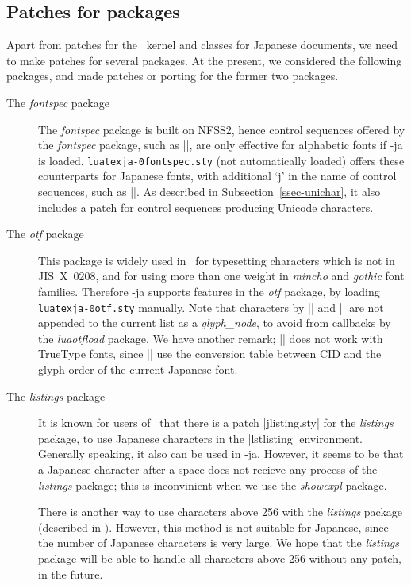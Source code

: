 \documentclass{ajt}
\begin{document}
\subsection{Patches for packages}
Apart from patches for the \LaTeXe~kernel and classes for Japanese
documents, we need to make patches for several packages. At the present,
we considered the following packages, and made patches or porting for
the former two packages.

\begin{description}
\item[The \emph{fontspec} package] The \emph{fontspec} package is built
	   on NFSS2, hence control sequences offered by the
	   \emph{fontspec} package, such as |\setmainfont|, are only
	   effective for alphabetic fonts if \LuaTeX-ja is loaded.
	   \texttt{luatexja-\penalty0fontspec.sty} (not automatically
	   loaded) offers these counterparts for Japanese fonts, with
	   additional `j' in the name of control sequences, such as
	   |\setmainjfont|. As described in
	   Subsection~\ref{ssec-unichar}, it also includes a patch for
	   control sequences producing Unicode characters.

\item[The \emph{otf} package]
This package is widely used in \pTeX\ for typesetting characters which is
not in JIS~X~0208, and for using more than one weight in \emph{mincho}
and \emph{gothic} font families. Therefore \LuaTeX-ja supports features
in the \emph{otf} package, by loading \texttt{luatexja-\penalty0otf.sty}
	   manually. Note that characters by || and
	   || are not appended to the current list as a
	   \emph{glyph\_node}, to avoid from callbacks by the
	   \emph{luaotfload} package. We have another remark; |\CID|
	   does not work with TrueType fonts, since |\CID| use the
	   conversion table between CID and the glyph order of the
	   current Japanese font.

\item[The \emph{listings} package]
It is known for users of \pTeX\ that there is a patch |jlisting.sty| for
	   the \emph{listings} package, to use Japanese characters in
	   the |lstlisting| environment. Generally speaking, it also can
	   be used in \LuaTeX-ja. However, it seems to be that a
	   Japanese character after a space does not recieve any process
	   of the \emph{listings} package; this is inconvinient when we
	   use the \emph{showexpl} package.

There is another way to use characters above 256 with the
	   \emph{listings} package (described in \cite{apl}). However,
	   this method is not suitable for Japanese, since the number of
	   Japanese characters is very large. We hope that the
	   \emph{listings} package will be able to handle all characters above
	   256 without any patch, in the future.


\end{description}
\end{document}

